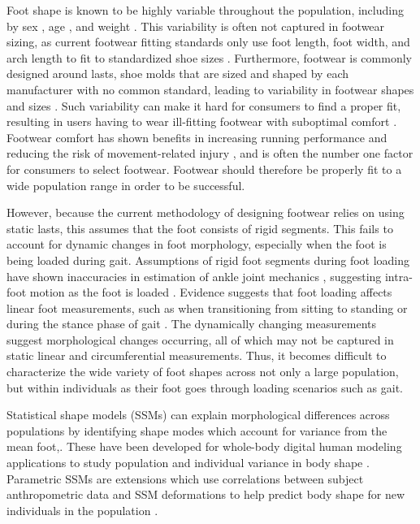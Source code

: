 \documentclass[defaultstyle,11pt]{comps}
\begin{document}
Foot shape is known to be highly variable throughout the population, including by sex \citep{Wunderlich2001, Krauss2008, Krauss2010}, age \citep{Tomassoni2014}, and weight \citep{Price2016}.
This variability is often not captured in footwear sizing, as current footwear fitting standards only use foot length, foot width, and arch length to fit to standardized shoe sizes \citep{ASTM2017}.
Furthermore, footwear is commonly designed around lasts, shoe molds that are sized and shaped by each manufacturer with no common standard, leading to variability in footwear shapes and sizes \citep{Jurca2013, Wannop2019}.
Such variability can make it hard for consumers to find a proper fit, resulting in users having to wear ill-fitting footwear with suboptimal comfort \citep{Dobson2018b}.
Footwear comfort has shown benefits in increasing running performance \citep{Luo2009} and reducing the risk of movement-related injury \citep{Mundermann2001a}, and is often the number one \citep{Martinez-Martinez2017} factor for consumers to select footwear.
Footwear should therefore be properly fit to a wide population range in order to be successful.

However, because the current methodology of designing footwear relies on using static lasts, this assumes that the foot consists of rigid segments.
This fails to account for dynamic changes in foot morphology, especially when the foot is being loaded during gait.
Assumptions of rigid foot segments during foot loading have shown inaccuracies in estimation of ankle joint mechanics \citep{Zelik2018, Kessler2020}, suggesting intra-foot motion as the foot is loaded \citep{Lundgren2008, Wolf2008}.
Evidence suggests that foot loading affects linear foot measurements, such as when transitioning from sitting to standing \citep{Xiong2009, Oladipo2008} or during the stance phase of gait \citep{Kouchi2009, Barisch-Fritz2014, Grau2018}.
The dynamically changing measurements suggest morphological changes occurring, all of which may not be captured in static linear and circumferential measurements.
Thus, it becomes difficult to characterize the wide variety of foot shapes across not only a large population, but within individuals as their foot goes through loading scenarios such as gait.

Statistical shape models (SSMs) can explain morphological differences across populations by identifying shape modes which account for variance from the mean foot,.
These have been developed for whole-body digital human modeling applications to study population and individual variance in body shape \citep{Allen2003, Anguelov2005, Reed2014, Park2015a, Park2017}.
Parametric SSMs are extensions which use correlations between subject anthropometric data and SSM deformations to help predict body shape for new individuals in the population \citep{Park2015a, Park2017}.
\end{document}
